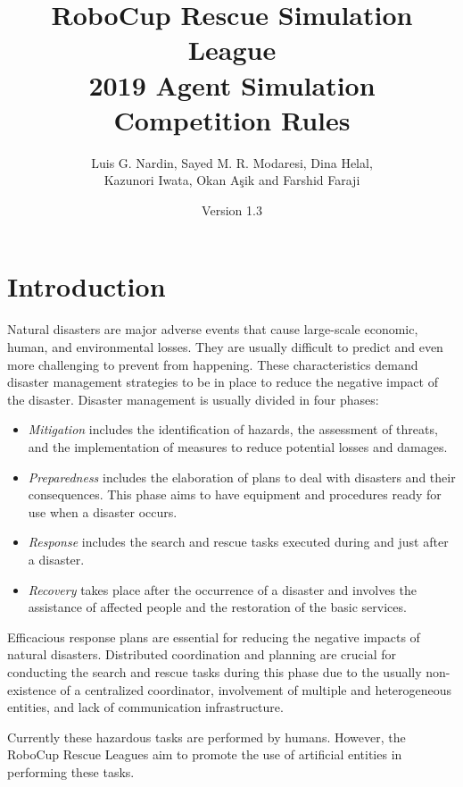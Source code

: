 \documentclass{article}
\begin{document}
\title{RoboCup Rescue Simulation League\\
       2019 Agent Simulation Competition Rules}
\author{Luis G. Nardin, Sayed M. R. Modaresi, Dina Helal,\\
Kazunori Iwata, Okan A{\c s}ik and Farshid Faraji}
\date{Version 1.3}
\maketitle
\section{Introduction}
\label{sec:introduction}
Natural disasters are major adverse events that cause large-scale economic, human, and environmental losses. They are usually difficult to predict and even more challenging to prevent from happening. These characteristics demand disaster management strategies to be in place to reduce the negative impact of the disaster. Disaster management is usually divided in four phases:
\begin{itemize}
\item \emph{Mitigation} includes the identification of hazards, the assessment of threats, and the implementation of measures to reduce potential losses and damages.
\item \emph{Preparedness} includes the elaboration of plans to deal with disasters and their consequences. This phase aims to have equipment and procedures ready for use when a disaster occurs.
\item \emph{Response} includes the search and rescue tasks executed during and just after a disaster.
\item \emph{Recovery} takes place after the occurrence of a disaster and involves the assistance of affected people and the restoration of the basic services.
\end{itemize}

Efficacious response plans are essential for reducing the negative impacts of natural disasters. Distributed coordination and planning are crucial for conducting the search and rescue tasks during this phase due to the usually non-existence of a centralized coordinator, involvement of multiple and heterogeneous entities, and lack of communication infrastructure.

Currently these hazardous tasks are performed by humans. However, the RoboCup Rescue Leagues aim to promote the use of artificial entities in performing these tasks.
\end{document}
